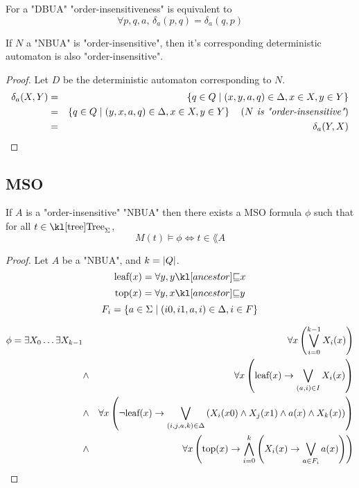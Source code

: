 \documentclass{article}
\begin{document}
\begin{remark}
	For a "DBUA" "order-insensitiveness" is equivalent to
	\[ \forall p,q,a,\, \delta_a (p,q) = \delta_a (q,p) \]
\end{remark}

\begin{lemma}
	If $N$ a "NBUA" is "order-insensitive", then it's corresponding deterministic automaton is also "order-insensitive".
\end{lemma}

\begin{proof}
	Let $D$ be the deterministic automaton corresponding to $N$.
	\begin{eqnarray*}
		\delta_a (X,Y) &=& \left\{q \in Q \mid (x,y,a,q) \in \Delta, x \in X, y \in Y\right\} \\
		&=& \left\{q \in Q \mid (y,x,a,q) \in \Delta, x \in X, y \in Y\right\}  \quad\left(\textit{$N$ is "order-insensitive"}\right) \\
		&=& \delta_a (Y,X)
	\end{eqnarray*}
\end{proof}

\subsection{MSO}

\begin{lemma}
	If $A$ is a "order-insensitive" "NBUA"  then there exists a MSO formula $\phi$ such that for all $t \in \tree_{\Sigma}$,
	\[ M(t) \models \phi \iff t \in \lang A \]
\end{lemma}

\begin{proof}
	Let $A$ be a "NBUA", and $k = \left|Q\right|$.
	\[\text{leaf} (x) = \forall y, \ancestor y x \]
	\[\text{top} (x) = \forall y, \ancestor x y \]
	\[F_i = \left\{a \in \Sigma \mid (i0,i1,a,i) \in \Delta, i \in F\right\}\]


	\begin{eqnarray*}
		\phi = \exists X_0 \ldots \exists X_{k-1} &\ & \forall x \left( \bigvee_{i=0}^{k-1} X_i(x) \right) \\
		&\land& \forall x \left( \text{leaf} (x) \rightarrow \bigvee_{(a,i)\in I}  X_i(x)   \right) \\
		&\land& \forall x \left(\lnot \text{leaf}(x) \rightarrow \bigvee_{(i,j,a,k)\in \Delta}  \left(X_i(x0) \land X_j(x1) \land a(x) \land X_k(x)\right)\right) \\
		&\land& \forall x \left(\text{top}(x) \rightarrow \bigwedge_{i= 0}^k \left( X_i(x) \rightarrow \bigvee_{a \in F_i} a(x) \right)\right)
	\end{eqnarray*}


\end{proof}





\end{document}
